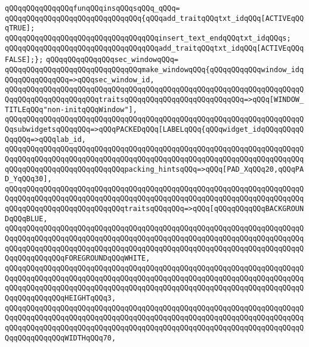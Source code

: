 \newline
\verb|qQQqqQQqqQQqqQQqfunqQQqinsqQQqsqQQq_qQQq=|\newline
\verb|qQQqqQQqqQQqqQQqqQQqqQQqqQQqqQQq{qQQqadd_traitqQQqtxt_idqQQq[ACTIVEqQQqTRUE];|\newline
\verb|qQQqqQQqqQQqqQQqqQQqqQQqqQQqqQQqqQQqinsert_text_endqQQqtxt_idqQQqs;|\newline
\verb|qQQqqQQqqQQqqQQqqQQqqQQqqQQqqQQqqQQqadd_traitqQQqtxt_idqQQq[ACTIVEqQQqFALSE];};|\newline
\newline
\verb|qQQqqQQqqQQqqQQqsec_windowqQQq=|\newline
\verb|qQQqqQQqqQQqqQQqqQQqqQQqqQQqqQQqmake_windowqQQq{qQQqqQQqqQQqwindow_idqQQqqQQqqQQqqQQq=>qQQqsec_window_id,|\newline
\verb|qQQqqQQqqQQqqQQqqQQqqQQqqQQqqQQqqQQqqQQqqQQqqQQqqQQqqQQqqQQqqQQqqQQqqQQqqQQqqQQqqQQqqQQqqQQqtraitsqQQqqQQqqQQqqQQqqQQqqQQqqQQq=>qQQq[WINDOW_TITLEqQQq"non-initqQQqWindow"],|\newline
\verb|qQQqqQQqqQQqqQQqqQQqqQQqqQQqqQQqqQQqqQQqqQQqqQQqqQQqqQQqqQQqqQQqqQQqqQQqsubwidgetsqQQqqQQq=>qQQqPACKEDqQQq[LABELqQQq{qQQqwidget_idqQQqqQQqqQQqqQQq=>qQQqlab_id,|\newline
\verb|qQQqqQQqqQQqqQQqqQQqqQQqqQQqqQQqqQQqqQQqqQQqqQQqqQQqqQQqqQQqqQQqqQQqqQQqqQQqqQQqqQQqqQQqqQQqqQQqqQQqqQQqqQQqqQQqqQQqqQQqqQQqqQQqqQQqqQQqqQQqqQQqqQQqqQQqqQQqqQQqqQQqqQQqpacking_hintsqQQq=>qQQq[PAD_XqQQq20,qQQqPAD_YqQQq30],|\newline
\verb|qQQqqQQqqQQqqQQqqQQqqQQqqQQqqQQqqQQqqQQqqQQqqQQqqQQqqQQqqQQqqQQqqQQqqQQqqQQqqQQqqQQqqQQqqQQqqQQqqQQqqQQqqQQqqQQqqQQqqQQqqQQqqQQqqQQqqQQqqQQqqQQqqQQqqQQqqQQqqQQqqQQqqQQqtraitsqQQqqQQq=>qQQq[qQQqqQQqqQQqBACKGROUNDqQQqBLUE,|\newline
\verb|qQQqqQQqqQQqqQQqqQQqqQQqqQQqqQQqqQQqqQQqqQQqqQQqqQQqqQQqqQQqqQQqqQQqqQQqqQQqqQQqqQQqqQQqqQQqqQQqqQQqqQQqqQQqqQQqqQQqqQQqqQQqqQQqqQQqqQQqqQQqqQQqqQQqqQQqqQQqqQQqqQQqqQQqqQQqqQQqqQQqqQQqqQQqqQQqqQQqqQQqqQQqqQQqqQQqqQQqqQQqqQQqFOREGROUNDqQQqWHITE,|\newline
\verb|qQQqqQQqqQQqqQQqqQQqqQQqqQQqqQQqqQQqqQQqqQQqqQQqqQQqqQQqqQQqqQQqqQQqqQQqqQQqqQQqqQQqqQQqqQQqqQQqqQQqqQQqqQQqqQQqqQQqqQQqqQQqqQQqqQQqqQQqqQQqqQQqqQQqqQQqqQQqqQQqqQQqqQQqqQQqqQQqqQQqqQQqqQQqqQQqqQQqqQQqqQQqqQQqqQQqqQQqqQQqqQQqHEIGHTqQQq3,|\newline
\verb|qQQqqQQqqQQqqQQqqQQqqQQqqQQqqQQqqQQqqQQqqQQqqQQqqQQqqQQqqQQqqQQqqQQqqQQqqQQqqQQqqQQqqQQqqQQqqQQqqQQqqQQqqQQqqQQqqQQqqQQqqQQqqQQqqQQqqQQqqQQqqQQqqQQqqQQqqQQqqQQqqQQqqQQqqQQqqQQqqQQqqQQqqQQqqQQqqQQqqQQqqQQqqQQqqQQqqQQqqQQqqQQqWIDTHqQQq70,|\newline
